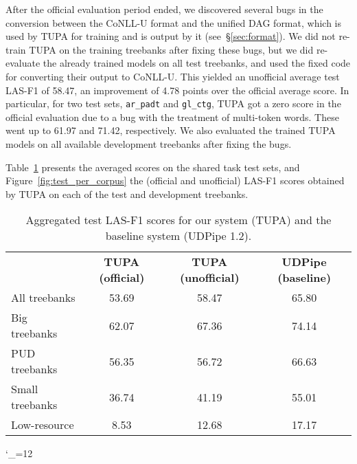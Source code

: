 \documentclass[11pt,a4paper]{article}
\begin{document}
After the official evaluation period ended,
we discovered several bugs in the conversion between the CoNLL-U format
and the unified DAG format, which is used by TUPA for training and is output by it
(see~\S\ref{sec:format}).
We did not re-train TUPA on the training treebanks after fixing these bugs,
but we did re-evaluate the already trained models on all test treebanks,
and used the fixed code for converting their output to CoNLL-U.
This yielded an unofficial average test LAS-F1 of 58.47,
an improvement of 4.78 points over the official average score.
In particular, for two test sets, \verb|ar_padt| and \verb|gl_ctg|, TUPA got
a zero score in the official evaluation due to a bug with the treatment of multi-token words.
These went up to 61.97 and 71.42, respectively.
We also evaluated the trained TUPA models on all available development treebanks
after fixing the bugs.

Table~\ref{tab:overall_results} presents the
averaged scores on the shared task test sets,
and Figure~\ref{fig:test_per_corpus} the (official and unofficial) LAS-F1
scores obtained by TUPA on each of the test and development treebanks.

\begin{table}
\begin{tabular}{lccc}
\hline
& \multirow{2}{12mm}{\bf TUPA {\small(official)}} & \multirow{2}{15mm}{\bf TUPA {\small(unofficial)}}
& \multirow{2}{14mm}{\bf UDPipe {\small(baseline)}} \\\\
\hline
All treebanks & 53.69 & 58.47 & 65.80 \\
Big treebanks & 62.07 & 67.36 & 74.14 \\
PUD treebanks & 56.35 & 56.72 & 66.63 \\
Small treebanks & 36.74 & 41.19 & 55.01 \\
Low-resource & 8.53 & 12.68 & 17.17
\end{tabular}
\caption{Aggregated test LAS-F1 scores
for our system (TUPA) and the baseline system (UDPipe 1.2).
\label{tab:overall_results}}
\end{table}

\catcode`\_=12
\corpusa
{}\corpusb
{}\corpusc
\end{document}
